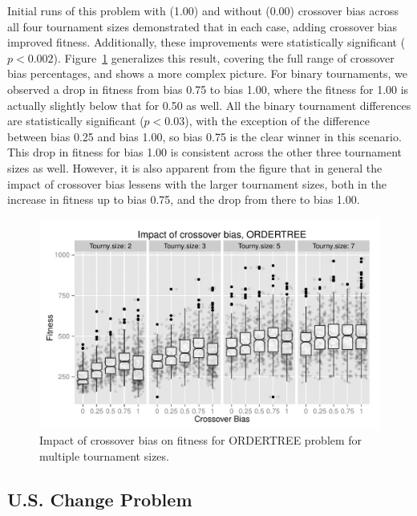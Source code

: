 \documentclass{sig-alternate}
\begin{document}
Initial runs of this problem with (1.00) and without (0.00) crossover bias across all four tournament sizes
demonstrated that in each case, adding crossover bias improved fitness. Additionally, these improvements were
statistically significant ($p < 0.002$). Figure~\ref{fig:Ordertree_results_all_tournaments_Jan15} generalizes this 
result, covering the full range of crossover bias
percentages, and shows a more complex picture. For binary tournaments, we observed a drop in fitness from bias 0.75 to
bias 1.00, where the fitness for 1.00 is actually slightly below that for 0.50 as well. All the binary tournament 
differences are
statistically significant ($p < 0.03$), with the exception of the difference between bias 0.25 and bias 1.00, so bias
0.75 is the clear winner in this scenario. This drop in fitness for bias 1.00 is consistent across the other three
tournament sizes as well. However, it is also apparent from the figure that in general the impact of crossover bias
lessens with the larger tournament sizes, both in the increase in fitness up to bias 0.75, and the drop from there to
bias 1.00.

\begin{figure}
\centering
\includegraphics[width=0.45 \textwidth]{Plots/Ordertree_results_all_tournaments_Jan15.pdf}
\caption{Impact of crossover bias on fitness for ORDERTREE problem for multiple tournament sizes.}
\label{fig:Ordertree_results_all_tournaments_Jan15}
\end{figure}

%
%
%
%

\subsection{U.S. Change Problem} \label{sec:USChange}
\end{document}
